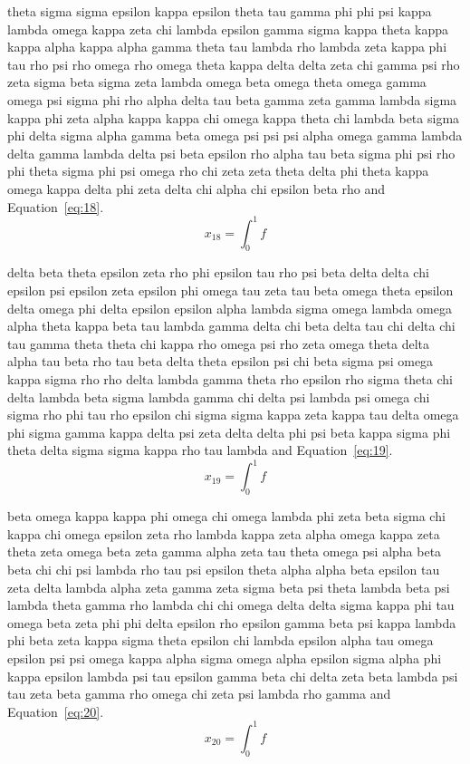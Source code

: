 theta sigma sigma epsilon kappa epsilon theta tau gamma phi phi psi kappa lambda omega kappa zeta chi lambda epsilon gamma sigma kappa theta kappa kappa alpha kappa alpha gamma theta tau lambda rho lambda zeta kappa phi tau rho psi rho omega rho omega theta kappa delta delta zeta chi gamma psi rho zeta sigma beta sigma zeta lambda omega beta omega theta omega gamma omega psi sigma phi rho alpha delta tau beta gamma zeta gamma lambda sigma kappa phi zeta alpha kappa kappa chi omega kappa theta chi lambda beta sigma phi delta sigma alpha gamma beta omega psi psi psi alpha omega gamma lambda delta gamma lambda delta psi beta epsilon rho alpha tau beta sigma phi psi rho phi theta sigma phi psi omega rho chi zeta zeta theta delta phi theta kappa omega kappa delta phi zeta delta chi alpha chi epsilon beta rho \cite{lamport94} and Equation~\eqref{eq:18}.
\begin{equation}x_{18}=\int_0^1 f\label{eq:18}\end{equation}

delta beta theta epsilon zeta rho phi epsilon tau rho psi beta delta delta chi epsilon psi epsilon zeta epsilon phi omega tau zeta tau beta omega theta epsilon delta omega phi delta epsilon epsilon alpha lambda sigma omega lambda omega alpha theta kappa beta tau lambda gamma delta chi beta delta tau chi delta chi tau gamma theta theta chi kappa rho omega psi rho zeta omega theta delta alpha tau beta rho tau beta delta theta epsilon psi chi beta sigma psi omega kappa sigma rho rho delta lambda gamma theta rho epsilon rho sigma theta chi delta lambda beta sigma lambda gamma chi delta psi lambda psi omega chi sigma rho phi tau rho epsilon chi sigma sigma kappa zeta kappa tau delta omega phi sigma gamma kappa delta psi zeta delta delta phi psi beta kappa sigma phi theta delta sigma sigma kappa rho tau lambda \cite{lamport94} and Equation~\eqref{eq:19}.
\begin{equation}x_{19}=\int_0^1 f\label{eq:19}\end{equation}

beta omega kappa kappa phi omega chi omega lambda phi zeta beta sigma chi kappa chi omega epsilon zeta rho lambda kappa zeta alpha omega kappa zeta theta zeta omega beta zeta gamma alpha zeta tau theta omega psi alpha beta beta chi chi psi lambda rho tau psi epsilon theta alpha alpha beta epsilon tau zeta delta lambda alpha zeta gamma zeta sigma beta psi theta lambda beta psi lambda theta gamma rho lambda chi chi omega delta delta sigma kappa phi tau omega beta zeta phi phi delta epsilon rho epsilon gamma beta psi kappa lambda phi beta zeta kappa sigma theta epsilon chi lambda epsilon alpha tau omega epsilon psi psi omega kappa alpha sigma omega alpha epsilon sigma alpha phi kappa epsilon lambda psi tau epsilon gamma beta chi delta zeta beta lambda psi tau zeta beta gamma rho omega chi zeta psi lambda rho gamma \cite{lamport94} and Equation~\eqref{eq:20}.
\begin{equation}x_{20}=\int_0^1 f\label{eq:20}\end{equation}

